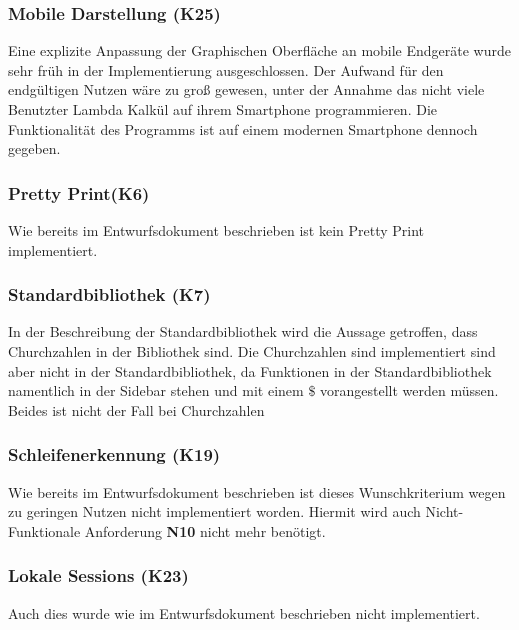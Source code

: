 \documentclass[parskip=full,11pt,twoside]{scrartcl}
\begin{document}
\subsubsection{Mobile Darstellung (K25)}
Eine explizite Anpassung der Graphischen Oberfläche an mobile Endgeräte wurde sehr früh in der Implementierung
ausgeschlossen.
Der Aufwand für den endgültigen Nutzen wäre zu groß gewesen, unter der Annahme das nicht viele Benutzter Lambda
Kalkül auf ihrem Smartphone programmieren.
Die Funktionalität des Programms ist auf einem modernen Smartphone dennoch gegeben.




\subsubsection{Pretty Print(K6)}
Wie bereits im Entwurfsdokument beschrieben ist kein Pretty Print implementiert.

\subsubsection{Standardbibliothek (K7)}
In der Beschreibung der Standardbibliothek wird die Aussage getroffen, dass
Churchzahlen in der Bibliothek sind.
Die Churchzahlen sind implementiert sind aber nicht in der Standardbibliothek,
da Funktionen in der Standardbibliothek namentlich in der Sidebar stehen und mit 
einem $\$$ vorangestellt werden müssen.
Beides ist nicht der Fall bei Churchzahlen

\subsubsection{Schleifenerkennung (K19)}
Wie bereits im Entwurfsdokument beschrieben ist dieses Wunschkriterium 
wegen zu geringen Nutzen nicht implementiert worden. 
Hiermit wird auch Nicht-Funktionale Anforderung \textbf{N10} nicht
mehr benötigt.

\subsubsection{Lokale Sessions (K23)}
Auch dies wurde wie im Entwurfsdokument beschrieben nicht implementiert.
\end{document}
